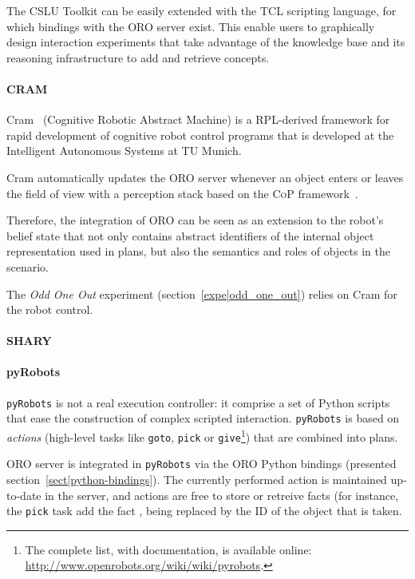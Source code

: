 The CSLU Toolkit can be easily extended with the TCL scripting language, for
which bindings with the ORO server exist. This enable users to graphically
design interaction experiments that take advantage of the knowledge base and
its reasoning infrastructure to add and retrieve concepts.

\paragraph{CRAM}
\label{sect|cram}

{\sc Cram}~\cite{Beetz2010} (Cognitive Robotic Abstract Machine) is a
RPL-derived framework for rapid development of cognitive robot control programs
that is developed at the Intelligent Autonomous Systems at TU Munich.

{\sc Cram} automatically updates the ORO server whenever an object enters or
leaves the field of view with a perception stack based on the \textsc{CoP}
framework~\cite{Klank2009}.

Therefore, the integration of ORO can be seen as an extension to
the robot's belief state that not only contains abstract identifiers
of the internal object representation used in plans, but also the
semantics and roles of objects in the scenario.

The \emph{Odd One Out} experiment (section~\ref{expe|odd_one_out}) relies on
{\sc Cram} for the robot control.

\paragraph{SHARY}

\paragraph{pyRobots} {\tt pyRobots} is not a real execution controller: it
comprise a set of Python scripts that ease the construction of complex scripted
interaction. {\tt pyRobots} is based on \emph{actions} (high-level tasks like
{\tt goto}, {\tt pick} or {\tt give}\footnote{The complete list, with
documentation, is available online:
\url{http://www.openrobots.org/wiki/wiki/pyrobots}.}) that are combined into
plans.

ORO server is integrated in {\tt pyRobots} via the ORO Python bindings
(presented section~\ref{sect|python-bindings}). The currently performed action
is maintained up-to-date in the server, and actions are free to store or
retreive facts (for instance, the {\tt pick} task add the fact ,  being replaced by the ID of the object
that is taken.

